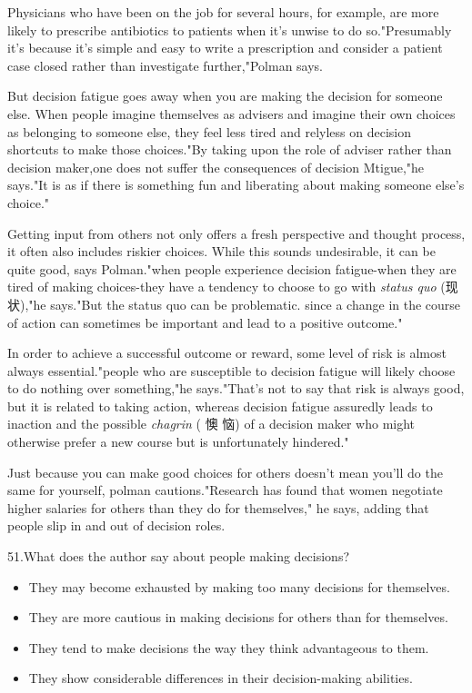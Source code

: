 \documentclass[UTF8,11pt]{ctexart}
\begin{document}
Physicians who have been on the job for several hours, for example, are more likely to prescribe antibiotics to patients when it's unwise to do so."Presumably it's because it's simple and easy to write a prescription and consider a patient case closed rather than investigate further,"Polman says.


But decision fatigue goes away when you are making the decision for someone else. When people imagine themselves as advisers and imagine their own choices as belonging to someone else, they feel less tired and relyless on decision shortcuts to make those choices."By taking upon the role of adviser rather than decision maker,one does not suffer the consequences of decision Mtigue,"he says."It is as if there is something fun and liberating about making someone else's choice."


Getting input from others not only offers a fresh perspective and thought process, it often also includes riskier choices. While this sounds undesirable, it can be quite good, says Polman."when people experience decision fatigue-when they are tired of making choices-they have a tendency to choose to go with\textit{ status quo} (现状),"he says."But the status quo can be problematic. since a change in the course of action can sometimes be important and lead to a positive outcome."


In order to achieve a successful outcome or reward, some level of risk is almost always essential."people who are susceptible to decision fatigue will likely choose to do nothing over something,"he says."That's not to say that risk is always good, but it is related to taking action, whereas decision fatigue assuredly leads to inaction and the possible\textit{ chagrin} ( 懊 恼) of a decision maker who might otherwise prefer a new course but is unfortunately hindered."


Just because you can make good choices for others doesn't mean you'll do the same for yourself, polman cautions."Research has found that women negotiate higher salaries for others than they do for themselves," he says, adding that people slip in and out of decision roles.


51.What does the author say about people making decisions?


\begin{itemize}[leftmargin=2em,itemsep=.2em,topsep=.4em]\item[A.] They may become exhausted by making too many decisions for themselves.
\item[B.] They are more cautious in making decisions for others than for themselves.
\item[C.] They tend to make decisions the way they think advantageous to them.
\item[D.] They show considerable differences in their decision-making abilities.
\end{itemize}
\end{document}
